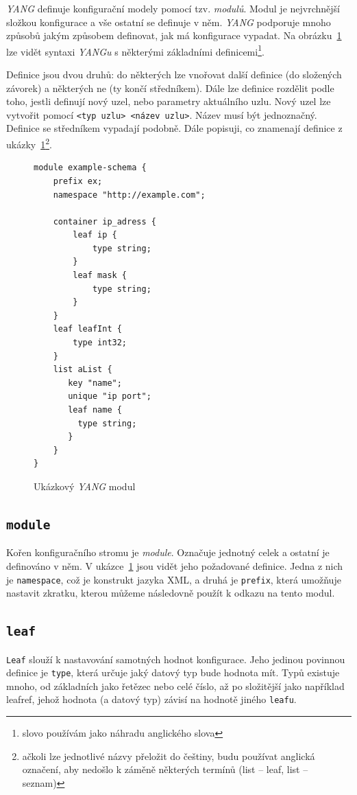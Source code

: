 \documentclass[thesis=B,czech,hidelinks]{FITthesis}[2019/03/06]
\begin{document}
\textit{YANG} definuje konfigurační modely pomocí tzv. \textit{modulů}. Modul je nejvrchnější složkou konfigurace a vše ostatní se definuje v něm. \textit{YANG} podporuje mnoho způsobů jakým způsobem definovat, jak má konfigurace vypadat. Na obrázku~\ref{yang_ukazka} lze vidět syntaxi \textit{YANGu} s některými základními definicemi\footnote{slovo  používám jako náhradu anglického slova }.

Definice jsou dvou druhů: do některých lze vnořovat další definice (do složených závorek) a některých ne (ty končí středníkem). Dále lze definice rozdělit podle toho, jestli definují nový uzel, nebo parametry aktuálního uzlu. Nový uzel lze vytvořit pomocí \texttt{<typ~uzlu>~<název~uzlu>}. Název musí být jednoznačný. Definice se středníkem vypadají podobně. Dále popisuji, co znamenají definice z ukázky~\ref{yang_ukazka}\footnote{ačkoli lze jednotlivé názvy přeložit do češtiny, budu používat anglická označení, aby nedošlo k záměně některých termínů (list -- leaf, list -- seznam)}.

\begin{figure}
\begin{verbatim}
module example-schema {
    prefix ex;
    namespace "http://example.com";

    container ip_adress {
        leaf ip {
            type string;
        }
        leaf mask {
            type string;
        }
    }
    leaf leafInt {
        type int32;
    }
    list aList {
       key "name";
       unique "ip port";
       leaf name {
         type string;
       }
    }
}
\end{verbatim}
\caption{Ukázkový \textit{YANG} modul}\label{yang_ukazka}
\end{figure}
\subsection{\texttt{module}}
Kořen konfiguračního stromu je \textit{module}. Označuje jednotný celek a ostatní je definováno v něm. V ukázce~\ref{yang_ukazka} jsou vidět jeho požadované definice. Jedna z nich je \texttt{namespace}, což je konstrukt jazyka XML, a druhá je \texttt{prefix}, která umožňuje nastavit zkratku, kterou můžeme následovně použít k odkazu na tento modul.

\subsection{\texttt{leaf}}
\texttt{Leaf} slouží k nastavování samotných hodnot konfigurace. Jeho jedinou povinnou definice je \texttt{type}, která určuje jaký datový typ bude hodnota mít. Typů existuje mnoho, od základních jako řetězec nebo celé číslo, až po složitější jako například leafref, jehož hodnota (a datový typ) závisí na hodnotě jiného \texttt{leafu}.
\end{document}
